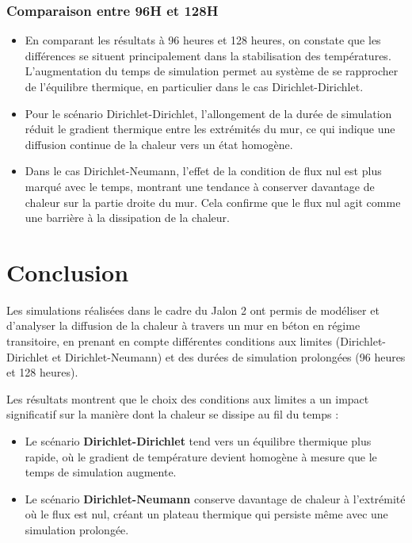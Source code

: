 \documentclass[a4paper,11pt]{article}
\begin{document}
\subsubsection{Comparaison entre 96H et 128H}
\begin{itemize}
    \item En comparant les résultats à 96 heures et 128 heures, on constate que les différences se situent principalement dans la stabilisation des températures. L'augmentation du temps de simulation permet au système de se rapprocher de l'équilibre thermique, en particulier dans le cas Dirichlet-Dirichlet.
    \item Pour le scénario Dirichlet-Dirichlet, l'allongement de la durée de simulation réduit le gradient thermique entre les extrémités du mur, ce qui indique une diffusion continue de la chaleur vers un état homogène.
    \item Dans le cas Dirichlet-Neumann, l'effet de la condition de flux nul est plus marqué avec le temps, montrant une tendance à conserver davantage de chaleur sur la partie droite du mur. Cela confirme que le flux nul agit comme une barrière à la dissipation de la chaleur.
\end{itemize}

\newpage
\section{Conclusion}
Les simulations réalisées dans le cadre du Jalon 2 ont permis de modéliser et d'analyser la diffusion de la chaleur à travers un mur en béton en régime transitoire, en prenant en compte différentes conditions aux limites (Dirichlet-Dirichlet et Dirichlet-Neumann) et des durées de simulation prolongées (96 heures et 128 heures). 

Les résultats montrent que le choix des conditions aux limites a un impact significatif sur la manière dont la chaleur se dissipe au fil du temps :
\begin{itemize}
    \item Le scénario \textbf{Dirichlet-Dirichlet} tend vers un équilibre thermique plus rapide, où le gradient de température devient homogène à mesure que le temps de simulation augmente.
    \item Le scénario \textbf{Dirichlet-Neumann} conserve davantage de chaleur à l'extrémité où le flux est nul, créant un plateau thermique qui persiste même avec une simulation prolongée.
\end{itemize}
\end{document}
